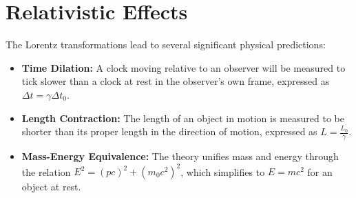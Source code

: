 \documentclass[12pt, a4paper]{article}
\begin{document}
\section{Relativistic Effects}
The Lorentz transformations lead to several significant physical predictions:
\begin{itemize}
    \item \textbf{Time Dilation:} A clock moving relative to an observer will be measured to tick slower than a clock at rest in the observer's own frame, expressed as $\Delta t = \gamma \Delta t_0$.
    \item \textbf{Length Contraction:} The length of an object in motion is measured to be shorter than its proper length in the direction of motion, expressed as $L = \frac{L_0}{\gamma}$.
    \item \textbf{Mass-Energy Equivalence:} The theory unifies mass and energy through the relation $E^2 = (pc)^2 + (m_0 c^2)^2$, which simplifies to $E = mc^2$ for an object at rest.
\end{itemize}
\end{document}
